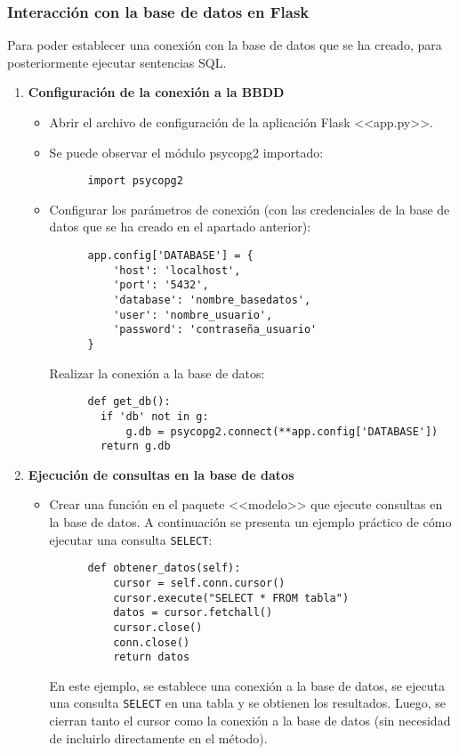 \subsubsection{Interacción con la base de datos en Flask}
Para poder establecer una conexión con la base de datos que se ha creado, para posteriormente ejecutar sentencias SQL.

\begin{enumerate}

  \item \textbf{Configuración de la conexión a la BBDD}

  \begin{itemize}
    \item Abrir el archivo de configuración de la aplicación Flask <<app.py>>.
    \item Se puede observar el módulo psycopg2 importado:
      \begin{verbatim}
      import psycopg2
      \end{verbatim}
    \item Configurar los parámetros de conexión (con las credenciales de la base de datos que se ha creado en el apartado anterior):
      \begin{verbatim}
      app.config['DATABASE'] = {
          'host': 'localhost',
          'port': '5432',
          'database': 'nombre_basedatos',
          'user': 'nombre_usuario',
          'password': 'contraseña_usuario'
      }
      \end{verbatim}
    Realizar la conexión a la base de datos:
      \begin{verbatim}
      def get_db():
        if 'db' not in g:
            g.db = psycopg2.connect(**app.config['DATABASE'])
        return g.db
      \end{verbatim}
  \end{itemize}

  \item \textbf{Ejecución de consultas en la base de datos}

  \begin{itemize}

    \item Crear una función en el paquete <<modelo>> que ejecute consultas en la base de datos. A continuación se presenta un ejemplo práctico de cómo ejecutar una consulta \texttt{SELECT}:
      \begin{verbatim}
      def obtener_datos(self):
          cursor = self.conn.cursor()
          cursor.execute("SELECT * FROM tabla")
          datos = cursor.fetchall()
          cursor.close()
          conn.close()
          return datos
      \end{verbatim}
      En este ejemplo, se establece una conexión a la base de datos, se ejecuta una consulta \texttt{SELECT} en una tabla y se obtienen los resultados. Luego, se cierran tanto el cursor como la conexión a la base de datos (sin necesidad de incluirlo directamente en el método).

  \end{itemize}
\end{enumerate}



